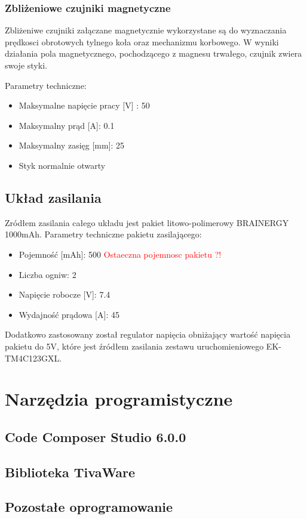 \subsubsection{Zbliżeniowe czujniki magnetyczne}
Zbliżeniwe czujniki załączane magnetycznie wykorzystane są do wyznaczania prędkosci obrotowych tylnego koła oraz mechanizmu korbowego. W wyniki działania pola magnetycznego, pochodzącego z magnesu trwałego, czujnik zwiera swoje styki. 
 
Parametry techniczne:
\begin{itemize}
\item
Maksymalne napięcie pracy [V] : 50
\item
Maksymalny prąd [A]: 0.1
\item
Maksymalny zasięg [mm]: 25
\item
Styk normalnie otwarty
\end{itemize}
\subsection{Układ zasilania}
Zródłem zasilania całego układu jest pakiet litowo-polimerowy BRAINERGY 1000mAh.
Parametry techniczne pakietu zasilającego:
\begin{itemize}
\item
Pojemność [mAh]: 500 \textcolor{red}{Ostaeczna pojemnosc pakietu ?!}
\item
Liczba ogniw: 2
\item
Napięcie robocze [V]: 7.4
\item
Wydajność prądowa [A]: 45
\end{itemize}

Dodatkowo zastosowany został regulator napięcia obniżający wartość napięcia pakietu do 5V, które jest źródłem zasilania zestawu uruchomieniowego EK-TM4C123GXL.
\section{Narzędzia programistyczne}
\subsection{Code Composer Studio 6.0.0}
\subsection{Biblioteka TivaWare}
\subsection{Pozostałe oprogramowanie}




